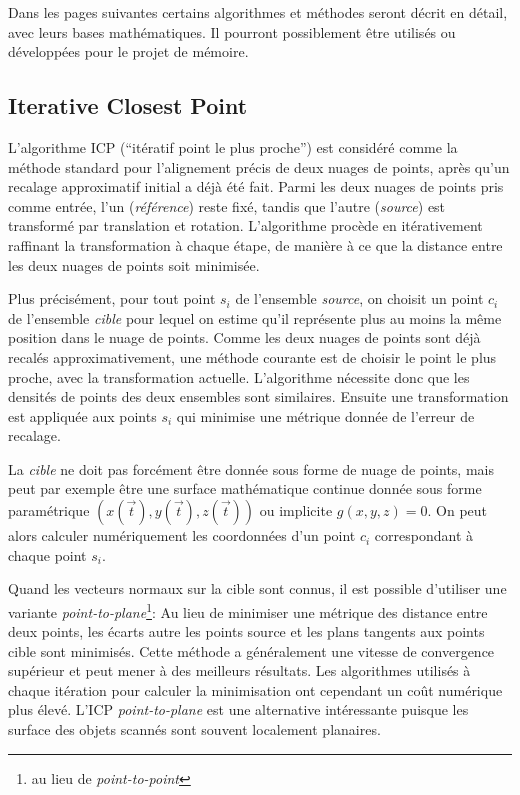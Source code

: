 \documentclass[a4paper,10pt]{scrreprt}
\begin{document}
Dans les pages suivantes certains algorithmes et méthodes seront décrit en détail, avec leurs bases mathématiques. Il pourront possiblement être utilisés ou développées pour le projet de mémoire.



\subsection{Iterative Closest Point}
L'algorithme ICP (``itératif point le plus proche'') est considéré comme la méthode standard pour l'alignement précis de deux nuages de points, après qu'un recalage approximatif initial a déjà été fait. Parmi les deux nuages de points pris comme entrée, l'un (\emph{référence}) reste fixé, tandis que l'autre (\emph{source}) est transformé par translation et rotation. L'algorithme procède en itérativement raffinant la transformation à chaque étape, de manière à ce que la distance entre les deux nuages de points soit minimisée.

Plus précisément, pour tout point $s_i$ de l'ensemble \emph{source}, on choisit un point $c_i$ de l'ensemble \emph{cible} pour lequel on estime qu'il représente plus au moins la même position dans le nuage de points. Comme les deux nuages de points sont déjà recalés approximativement, une méthode courante est de choisir le point le plus proche, avec la transformation actuelle. L'algorithme nécessite donc que les densités de points des deux ensembles sont similaires. Ensuite une transformation est appliquée aux points $s_i$ qui minimise une métrique donnée de l'erreur de recalage.

La \emph{cible} ne doit pas forcément être donnée sous forme de nuage de points, mais peut par exemple être une surface mathématique continue donnée sous forme paramétrique $(x(\vec{t}),y(\vec{t}),z(\vec{t}))$ ou implicite $g(x, y, z) = 0$. On peut alors calculer numériquement les coordonnées d'un point $c_i$ correspondant à chaque point $s_i$. \cite{Besl1992}

Quand les vecteurs normaux sur la cible sont connus, il est possible d'utiliser une variante \emph{point-to-plane}\footnote{au lieu de \emph{point-to-point}}: Au lieu de minimiser une métrique des distance entre deux points, les écarts autre les points source et les plans tangents aux points cible sont minimisés. Cette méthode a généralement une vitesse de convergence supérieur et peut mener à des meilleurs résultats. Les algorithmes utilisés à chaque itération pour calculer la minimisation ont cependant un coût numérique plus élevé. L'ICP \emph{point-to-plane} est une alternative intéressante puisque les surface des objets scannés sont souvent localement planaires. \cite{Low2004}
\end{document}
